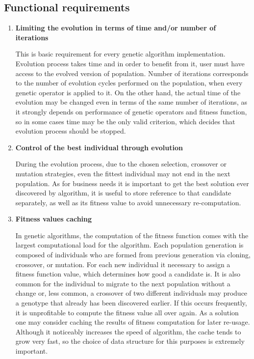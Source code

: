 \subsection{Functional requirements}
\begin{enumerate}
\item \label{freq:stop} \textbf{Limiting the evolution in terms of time and/or number of iterations}

This is basic requirement for every genetic algorithm implementation. Evolution process takes time and in order to benefit from it, user must have access to the evolved version of population. Number of iterations corresponds to the number of evolution cycles performed on the population, when every genetic operator is applied to it. On the other hand, the actual time of the evolution may be changed even in terms of the same number of iterations, as it strongly depends on performance of genetic operators and fitness function, so in some cases time may be the only valid criterion, which decides that evolution process should be stopped. 
\medbreak

\item \label{freq:best} \textbf{Control of the best individual through evolution}

During the evolution process, due to the chosen selection, crossover or mutation strategies, even the fittest individual may not end in the next population. As for business needs it is important to get the best solution ever discovered by algorithm, it is useful to store reference to that candidate separately, as well as its fitness value to avoid unnecessary re-computation.
\medbreak

\item \label{freq:cache} \textbf{Fitness values caching}

In genetic algorithms, the computation of the fitness function comes with the largest computational load for the algorithm. Each population generation is composed of individuals who are formed from previous generation via cloning, crossover, or mutation. For each new individual it necessary to assign a fitness function value, which determines how good a candidate is. It is also common for the individual to migrate to the next population without a change or, less common, a crossover of two different individuals may produce a genotype that already has been discovered earlier. If this occurs frequently, it is unprofitable to compute the fitness value all over again. As a solution one may consider caching the results of fitness computation for later re-usage. Although it noticeably increases the speed of algorithm, the cache tends to grow very fast, so the choice of data structure for this purposes is extremely important. 
\medbreak


\end{enumerate}

